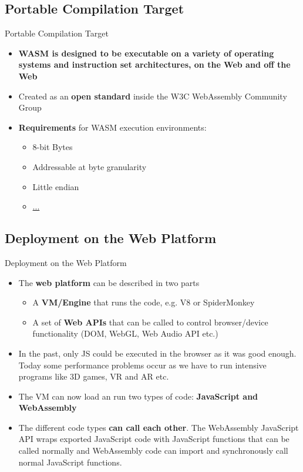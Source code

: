 \documentclass{beamer}
\begin{document}
\subsection{Portable Compilation Target}

\begin{frame}{Portable Compilation Target}
    \begin{itemize}
        \item \textbf{WASM is designed to be executable on a variety of operating systems and instruction set architectures, on the Web and off the Web}
        \item Created as an \textbf{open standard} inside the W3C WebAssembly Community Group
        \item \textbf{Requirements} for WASM execution environments:
              \begin{itemize}
                  \item 8-bit Bytes
                  \item Addressable at byte granularity
                  \item Little endian
                  \item \href{https://webassembly.org/docs/portability/}{...}
              \end{itemize}
    \end{itemize}
\end{frame}

\subsection{Deployment on the Web Platform}

\begin{frame}{Deployment on the Web Platform}
    \begin{itemize}
        \item The \textbf{web platform} can be described in two parts
              \begin{itemize}
                  \item A \textbf{VM/Engine} that runs the code, e.g. V8 or SpiderMonkey
                  \item A set of \textbf{Web APIs} that can be called to control browser/device functionality (DOM, WebGL, Web Audio API etc.)
              \end{itemize}
        \item In the past, only JS could be executed in the browser as it was good enough. Today some performance problems occur as we have to run intensive programs like 3D games, VR and AR etc.
        \item The VM can now load an run two types of code: \textbf{JavaScript and WebAssembly}
        \item The different code types \textbf{can call each other}. The WebAssembly JavaScript API wraps exported JavaScript code with JavaScript functions that can be called normally and WebAssembly code can import and synchronously call normal JavaScript functions.
    \end{itemize}
\end{frame}
\end{document}
